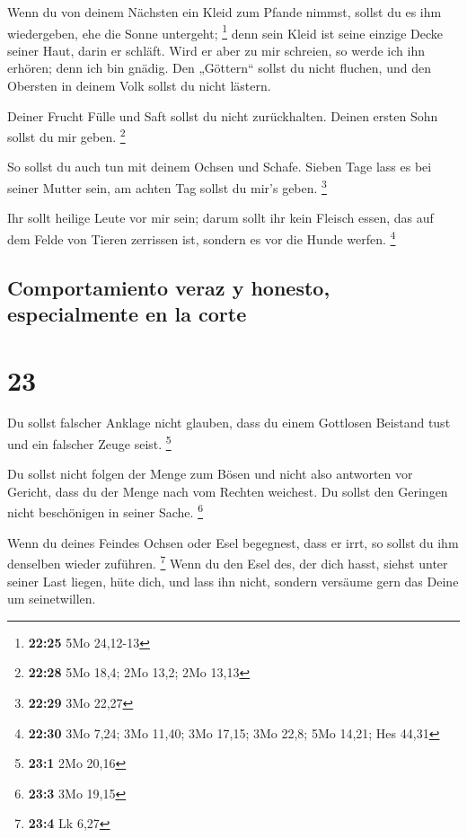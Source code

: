 Wenn du von deinem Nächsten ein Kleid zum Pfande nimmst,
sollst du es ihm wiedergeben, ehe die Sonne untergeht; \footnote{\textbf{22:25}
  5Mo 24,12-13}  denn sein Kleid ist seine einzige Decke
seiner Haut, darin er schläft. Wird er aber zu mir schreien, so werde
ich ihn erhören; denn ich bin gnädig.  Den „Göttern``
sollst du nicht fluchen, und den Obersten in deinem Volk sollst du nicht
lästern.

 Deiner Frucht Fülle und Saft sollst du nicht
zurückhalten. Deinen ersten Sohn sollst du mir geben. \footnote{\textbf{22:28}
  5Mo 18,4; 2Mo 13,2; 2Mo 13,13}

 So sollst du auch tun mit deinem Ochsen und Schafe.
Sieben Tage lass es bei seiner Mutter sein, am achten Tag sollst du
mir's geben. \footnote{\textbf{22:29} 3Mo 22,27}

 Ihr sollt heilige Leute vor mir sein; darum sollt ihr
kein Fleisch essen, das auf dem Felde von Tieren zerrissen ist, sondern
es vor die Hunde werfen. \footnote{\textbf{22:30} 3Mo 7,24; 3Mo 11,40;
  3Mo 17,15; 3Mo 22,8; 5Mo 14,21; Hes 44,31}

\hypertarget{comportamiento-veraz-y-honesto-especialmente-en-la-corte}{%
\subsection{Comportamiento veraz y honesto, especialmente en la
corte}\label{comportamiento-veraz-y-honesto-especialmente-en-la-corte}}

\hypertarget{section-22}{%
\section{23}\label{section-22}}

 Du sollst falscher Anklage nicht glauben, dass du einem
Gottlosen Beistand tust und ein falscher Zeuge seist. \footnote{\textbf{23:1}
  2Mo 20,16}

 Du sollst nicht folgen der Menge zum Bösen und nicht also
antworten vor Gericht, dass du der Menge nach vom Rechten weichest.
 Du sollst den Geringen nicht beschönigen in seiner Sache.
\footnote{\textbf{23:3} 3Mo 19,15}

 Wenn du deines Feindes Ochsen oder Esel begegnest, dass
er irrt, so sollst du ihm denselben wieder zuführen. \footnote{\textbf{23:4}
  Lk 6,27}  Wenn du den Esel des, der dich hasst, siehst
unter seiner Last liegen, hüte dich, und lass ihn nicht, sondern
versäume gern das Deine um seinetwillen.

